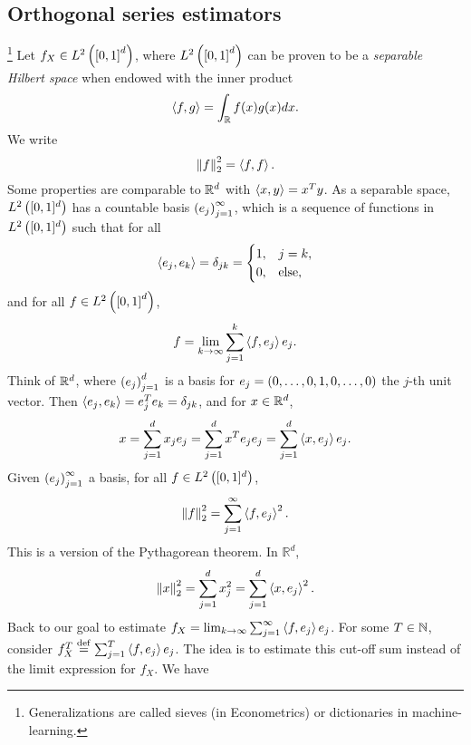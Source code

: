 \subsection{Orthogonal series estimators}\footnote{Generalizations are called sieves (in Econometrics) or dictionaries in machine-learning.}
Let $f_X\in L^2\left(\left[0,1\right]^d\right)$, where $L^2\left(\left[0,1\right]^d\right)$ can be proven to be a \textit{separable Hilbert space} when endowed with the inner product
\begin{equation*}
\left\langle f,g\right\rangle=\int_{\mathbb{R}} f(x)g(x) dx.
\end{equation*}
We write
\begin{equation*}
\left\| f \right\|_2^2 = \left\langle f,f\right\rangle.
\end{equation*}
{Some properties are comparable to $\mathbb{R}^d$ with $\left\langle x,y\right\rangle = x^T y$.} As a separable space, $L^2\left([0,1]^d\right)$ has a countable basis $\left(e_j\right)_{j=1}^\infty$, which is a sequence of functions in $L^2\left([0,1]^d\right)$ such that for all
\begin{equation*}
\left\langle e_j,e_k\right\rangle =\delta_{jk} = \begin{cases}
1, &j=k,\\
0, &\text{else},
\end{cases}
\end{equation*}
and for all $f\in L^2\left(\left[0,1\right]^d\right)$,
\begin{equation*}
f=\lim_{k\rightarrow\infty} \sum_{j=1}^k \left\langle f,e_j\right\rangle e_j.
\end{equation*}
{Think of $\mathbb{R}^d$, where $\left(e_j\right)_{j=1}^d$ is a basis for $e_j =\left(0,\ldots,0,1,0,\ldots,0\right)$ the $j$-th unit vector. Then $\left\langle e_j,e_k\right\rangle = e_j^T e_k = \delta_{jk}$, and for $x\in \mathbb{R}^d$,
\begin{equation*}
  x = \sum_{j=1}^d x_j e_j = \sum_{j=1}^d x^T e_j e_j = \sum_{j=1}^d \left\langle x,e_j\right\rangle e_j.
\end{equation*}}
Given $\left(e_j\right)_{j=1}^\infty$ a basis, for all $f\in L^2\left([0,1]^d\right)$, \begin{equation*}
\left\| f \right\|^2_2=\sum_{j=1}^\infty \left\langle f,e_j\right\rangle^2.
\end{equation*}
This is a version of the Pythagorean theorem. {In $\mathbb{R}^d$,
\begin{equation*}
\left\| x \right\|^2_2 = \sum_{j=1}^d x_j^2 = \sum_{j=1}^d \left\langle x,e_j\right\rangle^2.
\end{equation*}}
Back to our goal to estimate $f_X = \lim_{k\rightarrow \infty}\sum_{j=1}^\infty \left\langle f,e_j\right\rangle e_j$. For some $T\in \mathbb{N}$, consider $f_X^T \overset{\mathrm{def}}{=} \sum_{j=1}^T \left\langle f,e_j\right\rangle e_j$. The idea is to estimate this cut-off sum instead of the limit expression for $f_X$. We have

